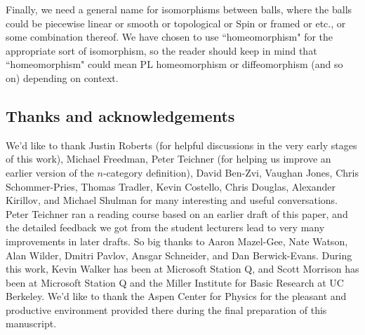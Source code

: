 Finally, we need a general name for isomorphisms between balls, where the balls could be
piecewise linear or smooth or topological or Spin or framed or etc., or some combination thereof.
We have chosen to use ``homeomorphism" for the appropriate sort of isomorphism, so the reader should
keep in mind that ``homeomorphism" could mean PL homeomorphism or diffeomorphism (and so on)
depending on context.

\subsection{Thanks and acknowledgements}
We'd like to thank 
Justin Roberts (for helpful discussions in the very early stages of this work), 
Michael Freedman, 
Peter Teichner (for helping us improve an earlier version of the $n$-category definition), 
David Ben-Zvi, 
Vaughan Jones, 
Chris Schommer-Pries, 
Thomas Tradler,
Kevin Costello, 
Chris Douglas,
Alexander Kirillov,
and
Michael Shulman
for many interesting and useful conversations. 
Peter Teichner ran a reading course based on an earlier draft of this paper, and the detailed feedback
we got from the student lecturers lead to very many improvements in later drafts.
So big thanks to
Aaron Mazel-Gee,
Nate Watson,
Alan Wilder,
Dmitri Pavlov,
Ansgar Schneider,
and
Dan Berwick-Evans.
During this work, Kevin Walker has been at Microsoft Station Q, and Scott Morrison has been at 
Microsoft Station Q and the Miller Institute for Basic Research at UC Berkeley. 
We'd like to thank the Aspen Center for Physics for the pleasant and productive 
environment provided there during the final preparation of this manuscript.

